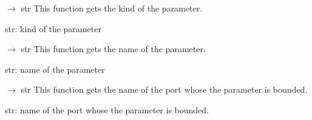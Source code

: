 \documentclass[letterpaper,10pt,english]{sphinxmanual}
\begin{document}
\begin{fulllineitems}
\begin{fulllineitems}
\end{fulllineitems}


\begin{fulllineitems}
\label{\detokenize{scrimp:scrimp.port.Parameter.get_kind}}
\pysigstartsignatures
\pysiglinewithargsret
{}
{}
{{ $\rightarrow$ str}}
\pysigstopsignatures
\sphinxAtStartPar
This function gets the kind of the parameter.
\begin{description}
\sphinxAtStartPar
str: kind of the parameter

\end{description}

\end{fulllineitems}


\begin{fulllineitems}
\label{\detokenize{scrimp:scrimp.port.Parameter.get_name}}
\pysigstartsignatures
\pysiglinewithargsret
{}
{}
{{ $\rightarrow$ str}}
\pysigstopsignatures
\sphinxAtStartPar
This function gets the name of the parameter.
\begin{description}
\sphinxAtStartPar
str: name of the parameter

\end{description}

\end{fulllineitems}


\begin{fulllineitems}
\label{\detokenize{scrimp:scrimp.port.Parameter.get_name_port}}
\pysigstartsignatures
\pysiglinewithargsret
{}
{}
{{ $\rightarrow$ str}}
\pysigstopsignatures
\sphinxAtStartPar
This function gets the name of the port whose the parameter is bounded.
\begin{description}
\sphinxAtStartPar
str: name of the port whose the parameter is bounded.

\end{description}

\end{fulllineitems}


\end{fulllineitems}
\end{document}
